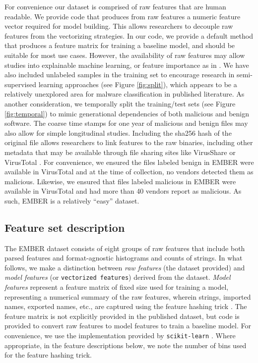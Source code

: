 For convenience our dataset is comprised of raw features that are human readable.  We provide code that produces from raw features a numeric feature vector required for model building.  This allows researchers to decouple raw features from the vectorizing strategies.  In our code, we provide a default method that produces a feature matrix for training a baseline model, and should be suitable for most use cases. However, the availability of raw features may allow studies into explainable machine learning, or feature importance as in \cite{shafiq2009framework}.  We have also included unlabeled samples in the training set to encourage research in semi-supervised learning approaches (see Figure \ref{fig:split}), which appears to be a relatively unexplored area for malware classification in published literature. As another consideration, we temporally split the training/test sets (see Figure \ref{fig:temporal}) to mimic generational dependencies of both malicious and benign software.  The coarse time stamps for one year of malicious and benign files may also allow for simple longitudinal studies.  Including the sha256 hash of the original file allows researchers to link features to the raw binaries, including other metadata that may be available through file sharing sites like VirusShare or VirusTotal \cite{virusshare,virustotal}.  For convenience, we ensured the files labeled benign in EMBER were available in VirusTotal and at the time of collection, no vendors detected them as malicious. Likewise, we ensured that files labeled malicious in EMBER were available in VirusTotal and had more than 40 vendors report as malicious. As such, EMBER is a relatively ``easy'' dataset. %

\subsection{Feature set description}
The EMBER dataset consists of eight groups of raw features that include both parsed features and format-agnostic histograms and counts of strings.  In what follows, we make a distinction between \textit{raw features} (the dataset provided) and \textit{model features} (or \texttt{vectorized features}) derived from the dataset.  \textit{Model features} represent a feature matrix of fixed size used for training a model, representing a numerical summary of the raw features, wherein strings, imported names, exported names, etc., are captured using the feature hashing trick \cite{weinberger2009feature}.  The feature matrix is not explicitly provided in the published dataset, but code is provided to convert raw features to model features to train a baseline model.  For convenience, we use the implementation provided by \texttt{scikit-learn} \cite{scikit-learn}.  Where appropriate, in the feature descriptions below, we note the number of bins used for the feature hashing trick.

